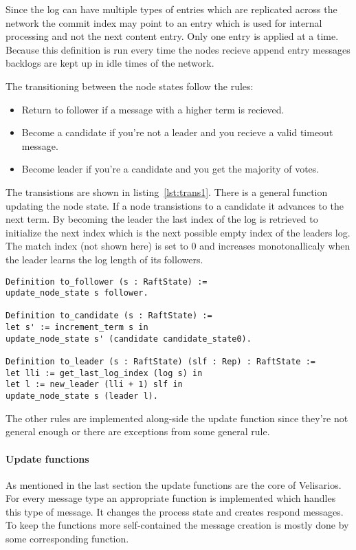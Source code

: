 Since the log can have multiple types of entries which are replicated
across the network the commit index may point to an entry which
is used for internal processing and not the next content entry.
Only one entry is applied at a time. Because this definition is run
every time the nodes recieve append entry messages backlogs are kept up
in idle times of the network.

The transitioning between the node states follow the rules:
\begin{itemize}
  \item Return to follower if a message with a higher term is recieved.
  \item Become a candidate if you're not a leader and you recieve a valid
    timeout message.
  \item Become leader if you're a candidate and you get the majority
    of votes.
\end{itemize}

The transistions are shown in listing~\ref{lst:trans1}. There is a general
function updating the node state. If a node transistions to a candidate
it advances to the next term. By becoming the leader the last index of
the log is retrieved to initialize the next index which is the next possible
empty index of the leaders log. The match index (not shown here) is
set to 0 and increases monotonallicaly when the leader learns the
log length of its followers. 

\begin{lstlisting}[style=coq,label=lst:trans1,
caption=The definitions on how a node changes it node state.]
Definition to_follower (s : RaftState) :=
update_node_state s follower.

Definition to_candidate (s : RaftState) :=
let s' := increment_term s in
update_node_state s' (candidate candidate_state0).

Definition to_leader (s : RaftState) (slf : Rep) : RaftState :=
let lli := get_last_log_index (log s) in
let l := new_leader (lli + 1) slf in 
update_node_state s (leader l).
\end{lstlisting}

The other rules are implemented along-side the update function since
they're not general enough or there are exceptions from some general rule.

\paragraph{Update functions}
As mentioned in the last section the update functions are the core
of Velisarios. For every message type an appropriate function is implemented
which handles this type of message. It changes the process state and
creates respond messages. To keep the functions more self-contained the
message creation is mostly done by some corresponding 
function.

